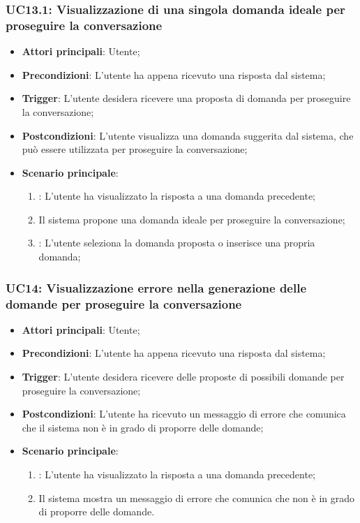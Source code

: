 \hypertarget{UC13.1}{}
\subsubsection{UC13.1: Visualizzazione di una singola domanda ideale per proseguire la conversazione}
\begin{itemize}
    \item \textbf{Attori principali}: Utente;
    \item \textbf{Precondizioni}: L'utente ha appena ricevuto una risposta dal sistema;
    \item \textbf{Trigger}: L'utente desidera ricevere una proposta di domanda per proseguire la conversazione;
    \item \textbf{Postcondizioni}: L'utente visualizza una domanda suggerita dal sistema, che può essere utilizzata per proseguire la conversazione;
    \item \textbf{Scenario principale}:
    \begin{enumerate}
        \item {}: L'utente ha visualizzato la risposta a una domanda precedente;
        \item Il sistema propone una domanda ideale per proseguire la conversazione;
        \item {}: L'utente seleziona la domanda proposta o inserisce una propria domanda;
    \end{enumerate}
\end{itemize}

\hypertarget{UC14}{}
\subsubsection{UC14: Visualizzazione errore nella generazione delle domande per proseguire la conversazione}
\begin{itemize}
    \item \textbf{Attori principali}: Utente;
    \item \textbf{Precondizioni}: L'utente ha appena ricevuto una risposta dal sistema;
    \item \textbf{Trigger}: L'utente desidera ricevere delle proposte di possibili domande per proseguire la conversazione;
    \item \textbf{Postcondizioni}: L'utente ha ricevuto un messaggio di errore che comunica che il sistema non è in grado di proporre delle domande;
    \item \textbf{Scenario principale}:
    \begin{enumerate}
        \item {}: L'utente ha visualizzato la risposta a una domanda precedente;
        \item Il sistema mostra un messaggio di errore che comunica che non è in grado di proporre delle domande.
    \end{enumerate}
\end{itemize}



